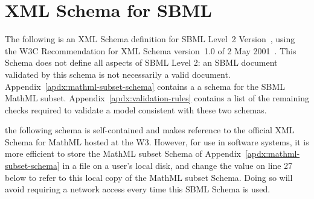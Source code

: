 
\section{XML Schema for SBML}
\label{apdx:schema}

The following is an XML Schema definition for SBML Level~2 Version~, using
the W3C Recommendation for XML Schema version~1.0 of 2 May
2001~\citep{biron:2000,fallside:2000,thompson:2000}.  This Schema
does not define all aspects of SBML Level 2: an SBML document
validated by this schema is not necessarily a valid \sbmltwo
document.  Appendix~\ref{apdx:mathml-subset-schema} contains a a
schema for the SBML MathML subset.
Appendix~\ref{apdx:validation-rules} contains a list of the
remaining checks required to validate a model  consistent with these two schemas.

 the following schema is
self-contained and makes reference to the official XML Schema for
MathML hosted at the W3.  However, for use in software systems, it
is more efficient to store the MathML subset Schema of
Appendix~\ref{apdx:mathml-subset-schema} in a file on a user's
local disk, and change the  value on line 27
below to refer to this local copy of the MathML subset Schema.
Doing so will avoid requiring a network access every time this
SBML Schema is used.

\begin{blockChanged}

\begin{example}
\begin{footnotesize}

\end{footnotesize}
\end{example}

\end{blockChanged}
